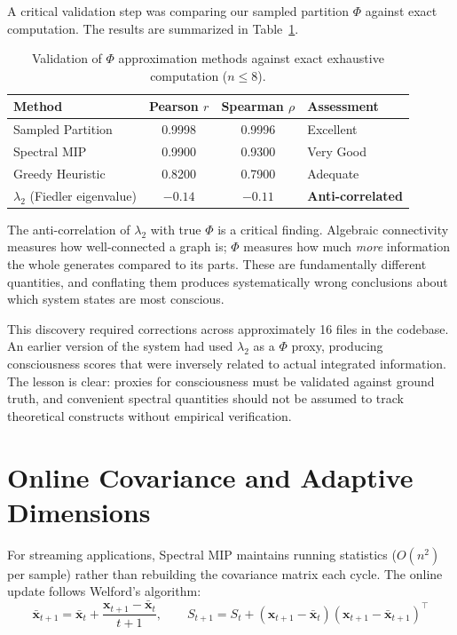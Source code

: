 \documentclass[12pt]{book}
\begin{document}
A critical validation step was comparing our sampled partition $\Phi$ against exact computation. The results are summarized in Table~\ref{tab:phi-validation}.

\begin{table}[H]
\centering
\caption{Validation of $\Phi$ approximation methods against exact exhaustive computation ($n \leq 8$).}
\label{tab:phi-validation}
\begin{tabular}{lccl}
\toprule
\textbf{Method} & \textbf{Pearson $r$} & \textbf{Spearman $\rho$} & \textbf{Assessment} \\
\midrule
Sampled Partition & 0.9998 & 0.9996 & Excellent \\
Spectral MIP & 0.9900 & 0.9300 & Very Good \\
Greedy Heuristic & 0.8200 & 0.7900 & Adequate \\
$\lambda_2$ (Fiedler eigenvalue) & $-0.14$ & $-0.11$ & \textbf{Anti-correlated} \\
\bottomrule
\end{tabular}
\end{table}

The anti-correlation of $\lambda_2$ with true $\Phi$ is a critical finding. Algebraic connectivity measures how well-connected a graph is; $\Phi$ measures how much \textit{more} information the whole generates compared to its parts. These are fundamentally different quantities, and conflating them produces systematically wrong conclusions about which system states are most conscious.

This discovery required corrections across approximately 16 files in the codebase. An earlier version of the system had used $\lambda_2$ as a $\Phi$ proxy, producing consciousness scores that were inversely related to actual integrated information. The lesson is clear: proxies for consciousness must be validated against ground truth, and convenient spectral quantities should not be assumed to track theoretical constructs without empirical verification.

\section{Online Covariance and Adaptive Dimensions}

For streaming applications, Spectral MIP maintains running statistics ($O(n^2)$ per sample) rather than rebuilding the covariance matrix each cycle. The online update follows Welford's algorithm:
\begin{equation}
\bar{\mathbf{x}}_{t+1} = \bar{\mathbf{x}}_t + \frac{\mathbf{x}_{t+1} - \bar{\mathbf{x}}_t}{t+1}, \qquad S_{t+1} = S_t + (\mathbf{x}_{t+1} - \bar{\mathbf{x}}_t)(\mathbf{x}_{t+1} - \bar{\mathbf{x}}_{t+1})^\top
\end{equation}
\end{document}
